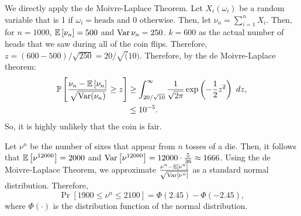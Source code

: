 \begin{problem}{3}
\end{problem}
\begin{solution}
    We directly apply the de Moivre-Laplace Theorem. Let $X_i(\omega_i)$ be a random variable that is 1 if $\omega_i =\text{heads}$ and 0 otherwise. Then, let $\nu_n = \sum_{i=1}^n X_i$. Then, for $n=1000$, $\mathbb{E}\left[\nu_n\right] = 500$ and $\operatorname{Var}{\nu_n} = 250$. $k=600$ as the actual number of heads that we saw during all of the coin flips. Therefore, 
    $z = (600 - 500) / \sqrt{250} = 20/\sqrt(10)$. Therefore, by the de Moivre-Laplace theorem:
    \begin{align*}
        \mathbb{P}\left[\frac{\nu_n - \mathbb{E}\left[\nu_n\right]}{\sqrt{\operatorname{Var}(\nu_n)}} \geq z\right] &\geq \int_{20/\sqrt{10}}^\infty \frac{1}{\sqrt{2\pi}}\exp\left(-\frac{1}{2}z^2\right)~dz, \\
        &\leq 10^{-5}.
    \end{align*}
    So, it is highly unlikely that the coin is fair.
\end{solution}
\begin{problem}{4}
    
\end{problem}
\begin{solution}
    
\end{solution}
\begin{problem}{5}
\end{problem}
\begin{solution}
    Let $\nu^n$ be the number of sixes that appear from $n$ tosses of a die. Then, it follows that $\mathbb{E}\left[\nu^{12000}\right] = 2000$ and $\operatorname{Var}\left[{\nu^{12000}}\right] = 12000\cdot\frac{5}{36} \approx 1666$. Using the de Moivre-Laplace Theorem, we approximate $\frac{\nu^n - \mathbb{E}\left[\nu^n\right]}{\sqrt{\operatorname{Var}[\nu^n]}}$ as a standard normal distribution. Therefore,
    \[\Pr[1900 \leq \nu^n \leq 2100] = \Phi(2.45) - \Phi(-2.45),\]
    where $\Phi(\cdot)$ is the distribution function of the normal distribution.
\end{solution}
\begin{problem}{6}
    
\end{problem}
\begin{solution}
    
\end{solution}
\begin{problem}{7}
    
\end{problem}
\begin{solution}
    
\end{solution}
\begin{problem}{8}
    
\end{problem}
\begin{solution}
    
\end{solution}